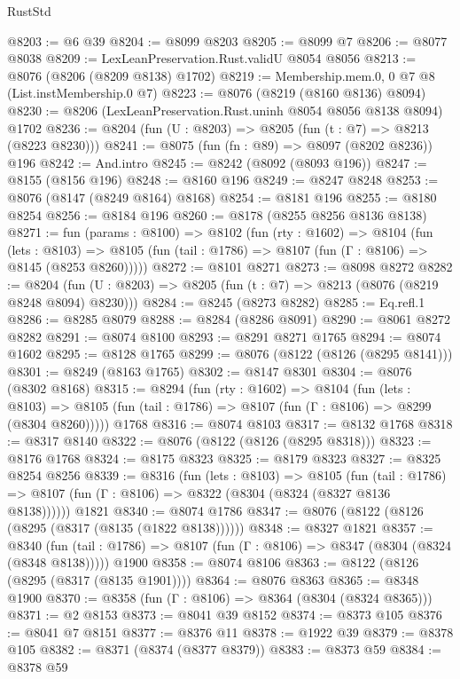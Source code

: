 \begin{lexlean}{RustStd}
\begin{coremodule}
@8203 := @6 @39
@8204 := @8099 @8203
@8205 := @8099 @7
@8206 := @8077 @8038
@8209 := LexLeanPreservation.Rust.validU @8054 @8056
@8213 := @8076 (@8206 (@8209 @8138) @1702)
@8219 := Membership.mem.{0, 0} @7 @8 (List.instMembership.{0} @7)
@8223 := @8076 (@8219 (@8160 @8136) @8094)
@8230 := @8206 (LexLeanPreservation.Rust.uninh @8054 @8056 @8138 @8094) @1702
@8236 := @8204 (fun (U : @8203) => @8205 (fun (t : @7) => @8213 (@8223 @8230)))
@8241 := @8075 (fun (fn : @89) => @8097 (@8202 @8236)) @196
@8242 := And.intro
@8245 := @8242 (@8092 (@8093 @196))
@8247 := @8155 (@8156 @196)
@8248 := @8160 @196
@8249 := @8247 @8248
@8253 := @8076 (@8147 (@8249 @8164) @8168)
@8254 := @8181 @196
@8255 := @8180 @8254
@8256 := @8184 @196
@8260 := @8178 (@8255 @8256 @8136 @8138)
@8271 := fun (params : @8100) =>
  @8102
    (fun (rty : @1602) =>
    @8104
      (fun (lets : @8103) =>
      @8105 (fun (tail : @1786) => @8107 (fun (Γ : @8106) => @8145 (@8253 @8260)))))
@8272 := @8101 @8271
@8273 := @8098 @8272
@8282 := @8204 (fun (U : @8203) => @8205 (fun (t : @7) => @8213 (@8076 (@8219 @8248 @8094) @8230)))
@8284 := @8245 (@8273 @8282)
@8285 := Eq.refl.{1}
@8286 := @8285 @8079
@8288 := @8284 (@8286 @8091)
@8290 := @8061 @8272 @8282
@8291 := @8074 @8100
@8293 := @8291 @8271 @1765
@8294 := @8074 @1602
@8295 := @8128 @1765
@8299 := @8076 (@8122 (@8126 (@8295 @8141)))
@8301 := @8249 (@8163 @1765)
@8302 := @8147 @8301
@8304 := @8076 (@8302 @8168)
@8315 := @8294
    (fun (rty : @1602) =>
    @8104
      (fun (lets : @8103) =>
      @8105 (fun (tail : @1786) => @8107 (fun (Γ : @8106) => @8299 (@8304 @8260)))))
    @1768
@8316 := @8074 @8103
@8317 := @8132 @1768
@8318 := @8317 @8140
@8322 := @8076 (@8122 (@8126 (@8295 @8318)))
@8323 := @8176 @1768
@8324 := @8175 @8323
@8325 := @8179 @8323
@8327 := @8325 @8254 @8256
@8339 := @8316
    (fun (lets : @8103) =>
    @8105
      (fun (tail : @1786) => @8107 (fun (Γ : @8106) => @8322 (@8304 (@8324 (@8327 @8136 @8138))))))
    @1821
@8340 := @8074 @1786
@8347 := @8076 (@8122 (@8126 (@8295 (@8317 (@8135 (@1822 @8138))))))
@8348 := @8327 @1821
@8357 := @8340
    (fun (tail : @1786) => @8107 (fun (Γ : @8106) => @8347 (@8304 (@8324 (@8348 @8138)))))
    @1900
@8358 := @8074 @8106
@8363 := @8122 (@8126 (@8295 (@8317 (@8135 @1901))))
@8364 := @8076 @8363
@8365 := @8348 @1900
@8370 := @8358 (fun (Γ : @8106) => @8364 (@8304 (@8324 @8365)))
@8371 := @2 @8153
@8373 := @8041 @39 @8152
@8374 := @8373 @105
@8376 := @8041 @7 @8151
@8377 := @8376 @11
@8378 := @1922 @39
@8379 := @8378 @105
@8382 := @8371 (@8374 (@8377 @8379))
@8383 := @8373 @59
@8384 := @8378 @59

\end{coremodule}
\end{lexlean}
